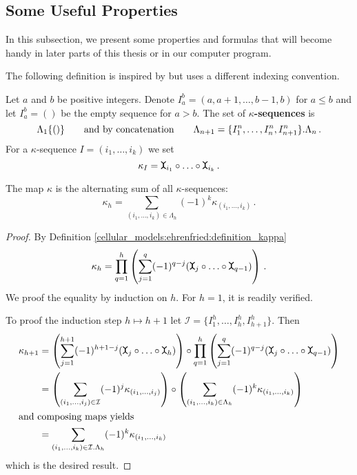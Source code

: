\subsection{Some Useful Properties}
In this subsection, we present some properties and formulas that will become handy in later parts of this thesis or in our computer program.

The following definition is inspired by \cite[Lemma 2.3.33]{Hess2012} but uses a different indexing convention.
\begin{defi}
    \label{cellular_models:ehrenfried:kappa_sequences}
    Let $a$ and $b$ be positive integers.
    Denote $I_a^b = (a,a+1, \ldots, b-1, b)$ for $a \le b$ and let $I_a^b = ()$ be the empty sequence for $a > b$.
    The set of {\bfseries $\kappa$-sequences} is
    \[
        \Lambda_1 \{ () \} \mspc{and by concatenation}{20} \Lambda_{n+1} = \{ I_1^n, \ldots, I_n^n, I_{n+1}^n \}.\Lambda_n \,.
    \]
    For a $\kappa$-sequence $I = (i_1, \ldots, i_k)$ we set
    \[
        \kappa_I = \mueta_{i_1} \circ \ldots \circ \mueta_{i_k} \,.
    \]
\end{defi}

\begin{lem}
    \label{cellular_models:ehrenfried:formula_for_kappa}
    The map $\kappa$ is the alternating sum of all $\kappa$-sequences:
    \[
        \kappa_h = \sum_{(i_1, \ldots, i_k) \in \Lambda_h} (-1)^k \kappa_{(i_1, \ldots, i_k)} \,.
    \]
\end{lem}

\begin{proof}
    By Definition \ref{cellular_models:ehrenfried:definition_kappa}
    \[
        \kappa_h = \prod_{q=1}^h \left( \sum_{j=1}^q (-1)^{q-j} (\mueta_j \circ \ldots \circ \mueta_{q-1}) \right) \,.
    \]
    We proof the equality by induction on $h$.
    For $h = 1$, it is readily verified.
    
    To proof the induction step $h \mapsto h+1$ let $\mathcal I = \{ I_1^h, \ldots, I_h^h, I_{h+1}^h \}$.
    Then
    \begin{align}
        \kappa_{h+1}
            &= \left( \sum_{j=1}^{h+1} (-1)^{h+1-j} (\mueta_j \circ \ldots \circ \mueta_h) \right) \circ \prod_{q=1}^{h} \left( \sum_{j=1}^q (-1)^{q-j} (\mueta_j \circ \ldots \circ \mueta_{q-1}) \right) \\
            &= \left( \sum_{(i_1, \ldots, i_j) \in \mathcal I} (-1)^{j} \kappa_{(i_1, \ldots, i_j)} \right) \circ \left( \sum_{(i_1, \ldots, i_k) \in \Lambda_h} (-1)^k \kappa_{(i_1, \ldots, i_k)} \right) \\
            \intertext{and composing maps yields}
            &= \sum_{(i_1, \ldots, i_k) \in \mathcal I .\Lambda_h} (-1)^k \kappa_{(i_1, \ldots, i_k)}
    \end{align}
    which is the desired result.
\end{proof}

